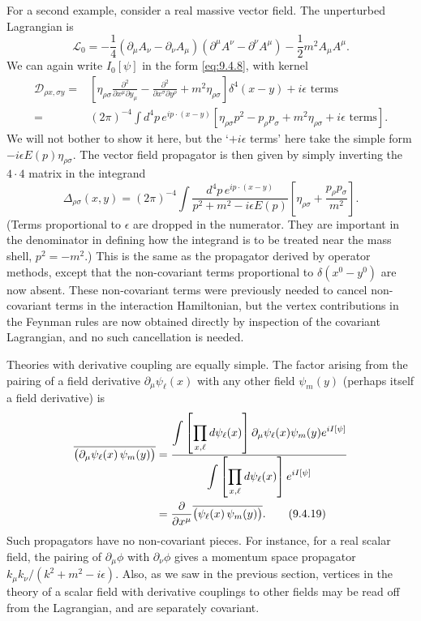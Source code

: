 For a second example, consider a real massive vector field. The unperturbed
Lagrangian is
\[
\mathcal L_0=-\frac14(\partial_\mu A_\nu-\partial_\nu A_\mu)
 (\partial^\mu A^\nu-\partial^\nu A^\mu)-\frac12m^2A_\mu A^\mu.
\]
We can again write $I_0[\psi]$ in the form \eqref{eq:9.4.8}, with kernel
\begin{align*}
\mathcal D_{\rho x,\sigma y}
={}&\left[\eta_{\rho\sigma}
 \frac{\partial^2}{\partial x^\mu\partial y_\mu}
 -\frac{\partial^2}{\partial x^\sigma\partial y^\rho}
 +m^2\eta_{\rho\sigma}\right]\delta^4(x-y)+i\epsilon\text{ terms}
\\
={}&(2\pi)^{-4}\int d^4p\,e^{ip\cdot(x-y)}
 \left[\eta_{\rho\sigma}p^2-p_\rho p_\sigma
 +m^2\eta_{\rho\sigma}+i\epsilon\text{ terms}\right].
\end{align*}
We will not bother to show it here, but the `$+i\epsilon$ terms' here take the
simple form $-i\epsilon E(p)\eta_{\rho\sigma}$. The vector field propagator is
then given by simply inverting the $4\cdot4$ matrix in the integrand
\[
\Delta_{\rho\sigma}(x,y)=(2\pi)^{-4}\int
 \frac{d^4p\,e^{ip\cdot(x-y)}}{p^2+m^2-i\epsilon E(p)}
 \left[\eta_{\rho\sigma}+\frac{p_\rho p_\sigma}{m^2}\right].
\]
(Terms proportional to $\epsilon$ are dropped in the numerator. They are
important in the denominator in defining how the integrand is to be treated
near the mass shell, $p^2=-m^2$.) This is the same as the propagator derived by
operator methods, except that the non-covariant terms proportional to
$\delta(x^0-y^0)$ are now absent. These non-covariant terms were previously
needed to cancel non-covariant terms in the interaction Hamiltonian, but the
vertex contributions in the Feynman rules are now obtained directly by
inspection of the covariant Lagrangian, and no such cancellation is needed.

Theories with derivative coupling are equally simple. The factor arising from
the pairing of a field derivative $\partial_\mu\psi_\ell(x)$ with any other
field $\psi_m(y)$ (perhaps itself a field derivative) is
\begin{align}
\overline{\bigl(\partial_\mu\psi_\ell(x)\,\psi_m(y)\bigr)}
&=\frac{\displaystyle\int\left[\prod_{x,\ell}d\psi_\ell(x)\right]
 \partial_\mu\psi_\ell(x)\psi_m(y)e^{iI[\psi]}}
 {\displaystyle\int\left[\prod_{x,\ell}d\psi_\ell(x)\right]e^{iI[\psi]}}
\notag\\
&=\frac{\partial}{\partial x^\mu}
 \overline{\bigl(\psi_\ell(x)\,\psi_m(y)\bigr)}.
\tag{9.4.19}\label{eq:9.4.19}
\end{align}
Such propagators have no non-covariant pieces. For instance, for a real scalar
field, the pairing of $\partial_\mu\phi$ with $\partial_\nu\phi$ gives a
momentum space propagator $k_\mu k_\nu/(k^2+m^2-i\epsilon)$. Also, as we saw in
the previous section, vertices in the theory of a scalar field with derivative
couplings to other fields may be read off from the Lagrangian, and are
separately covariant.
